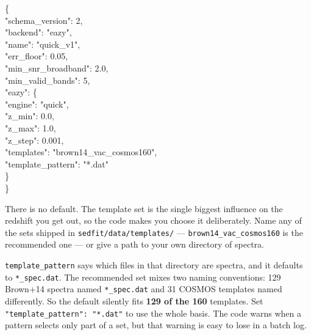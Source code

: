 \documentclass[11pt]{article}
\begin{document}
\begin{cmd}\ttfamily
\{\\
\hspace*{2em}"schema\_version": 2,\\
\hspace*{2em}"backend": "eazy",\\
\hspace*{2em}"name": "quick\_v1",\\
\hspace*{2em}"err\_floor": 0.05,\\
\hspace*{2em}"min\_snr\_broadband": 2.0,\\
\hspace*{2em}"min\_valid\_bands": 5,\\
\hspace*{2em}"eazy": \{\\
\hspace*{4em}"engine": "quick",\\
\hspace*{4em}"z\_min": 0.0,\\
\hspace*{4em}"z\_max": 1.0,\\
\hspace*{4em}"z\_step": 0.001,\\
\hspace*{4em}"templates": "brown14\_vac\_cosmos160",\\
\hspace*{4em}"template\_pattern": "*.dat"\\
\hspace*{2em}\}\\
\}
\end{cmd}

\begin{notebox}
There is no default. The template set is the single biggest influence on
the redshift you get out, so the code makes you choose it deliberately.
Name any of the sets shipped in \texttt{sedfit/data/templates/} ---
\texttt{brown14\_vac\_cosmos160} is the recommended one --- or give a path
to your own directory of spectra.
\end{notebox}

\begin{warnbox}
\texttt{template\_pattern} says which files in that directory are
spectra, and it defaults to \texttt{*\_spec.dat}. The recommended set
mixes two naming conventions: 129 Brown+14 spectra named
\texttt{*\_spec.dat} and 31 COSMOS templates named differently. So the
default silently fits \textbf{129 of the 160} templates. Set
\texttt{"template\_pattern": "*.dat"} to use the whole basis. The code
warns when a pattern selects only part of a set, but that warning is
easy to lose in a batch log.
\end{warnbox}
\end{document}
